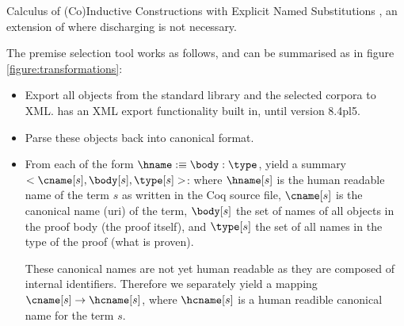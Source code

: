 \begin{definition}[\acic]
	Calculus of (Co)Inductive Constructions with Explicit Named Substitutions \cite{coen2000progettazione},
	an extension of \cic where discharging is not necessary.
\end{definition}

The premise selection tool works as follows, and can be summarised as in figure \ref{figure:transformations}:
\begin{itemize}
    \item Export all \coq objects from the standard library and the selected corpora to XML.
		\coq has an XML export functionality built in, until version 8.4pl5.
	\item Parse these objects back into canonical \acic{} format.
	\item From each \coqobj[s] of the form $\hname :\equiv \body : \type$, yield a summary $<\cname[s], \body[s], \type[s]>$:
		where $\hname[s]$  is the human readable name of the term $s$ as written in the Coq source file,
		$\cname[s]$  is the canonical name (uri) of the term,
		$\body[s]$  the set of names of all objects in the proof body (the proof itself),
		and $\type[s]$  the set of all names in the type of the proof (what is proven).
		
		These canonical names are not yet human readable as they are composed of internal identifiers.
		Therefore we separately yield a mapping $\cname[s] \rightarrow \hcname[s]$,
		where $\hcname[s]$  is a human readible canonical name for the term $s$.
		

\end{itemize}
